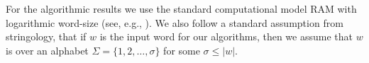 \documentclass[runningheads,UKenglish,cleveref, autoref, thm-restate]{llncs}
\newcommand{\N}{\mathbb{N}}
\DeclareMathOperator\ScatFact{SubSeq}
\DeclareMathOperator{\letters}{alph}
\DeclareMathOperator{\NUniv}{NUniv}
\DeclarePairedDelimiter\card{\lvert}{\rvert}
\DeclarePairedDelimiter\paren{(}{)}
\begin{document}

For the algorithmic results we use the standard 
computational model RAM with logarithmic word-size (see, e.g., \cite{KarkkainenSB06}). We also 
follow a standard assumption from stringology, that if $w$ is the 
input word for our algorithms, then we assume that $w$ is over an alphabet $\Sigma=\{ 1,2, \ldots, \sigma\}$ for some $\sigma\leq |w|$.


	
	
	
	
\end{document}
